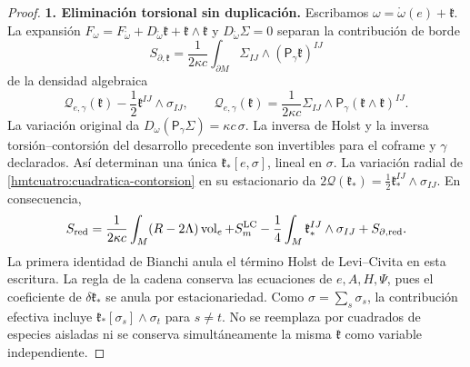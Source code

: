 \begin{proof}
\par\medskip\noindent\textbf{1. Eliminación torsional sin duplicación.}\quad
Escribamos \(\omega=\mathring\omega(e)+\mathfrak k\).
La expansión \(F_\omega=F_{\mathring\omega}
+D_{\mathring\omega}\mathfrak k+\mathfrak k\wedge\mathfrak k\)
y \(D_{\mathring\omega}\Sigma=0\) separan la contribución de borde
\[
 S_{\partial,\mathfrak k}
 =\frac1{2\kappa c}\int_{\partial M}
                  \Sigma_{IJ}\wedge(\mathsf P_\gamma\mathfrak k)^{IJ}
\]
de la densidad algebraica
\begin{equation}
 \mathcal Q_{e,\gamma}(\mathfrak k)
       -\frac12\mathfrak k^{IJ}\wedge\sigma_{IJ},\qquad
 \mathcal Q_{e,\gamma}(\mathfrak k)=\frac1{2\kappa c}
       \Sigma_{IJ}\wedge
       \mathsf P_\gamma(\mathfrak k\wedge\mathfrak k)^{IJ}.
 \label{hmtcuatro:cuadratica-contorsion}
\end{equation}
La variación original da
\(D_\omega(\mathsf P_\gamma\Sigma)=\kappa c\,\sigma\).
La inversa de Holst y la inversa torsión--contorsión del desarrollo
precedente son invertibles para el coframe y \(\gamma\) declarados.
Así determinan una única \(\mathfrak k_*[e,\sigma]\), lineal en
\(\sigma\). La variación radial de
\eqref{hmtcuatro:cuadratica-contorsion} en su estacionario da
\(2\mathcal Q(\mathfrak k_*)=\frac12\mathfrak k_*^{IJ}\wedge\sigma_{IJ}\).
En consecuencia,
\begin{equation}
 S_{\rm red}=\frac1{2\kappa c}\int_M(R-2\Lambda)\operatorname{vol}_e
       +S_m^{\rm LC}
       -\frac14\int_M\mathfrak k_*^{IJ}\wedge\sigma_{IJ}
       +S_{\partial,\rm red}.
 \label{hmtcuatro:accion-reducida}
\end{equation}
La primera identidad de Bianchi anula el término Holst de
Levi--Civita en esta escritura. La regla de la cadena conserva las
ecuaciones de \(e,A,H,\Psi\), pues el coeficiente de
\(\delta\mathfrak k_*\) se anula por estacionariedad.
Como \(\sigma=\sum_s\sigma_s\), la contribución efectiva incluye
\(\mathfrak k_*[\sigma_s]\wedge\sigma_t\) para \(s\ne t\).
No se reemplaza por cuadrados de especies aisladas ni se conserva
simultáneamente la misma \(\mathfrak k\) como variable independiente.


\end{proof}
